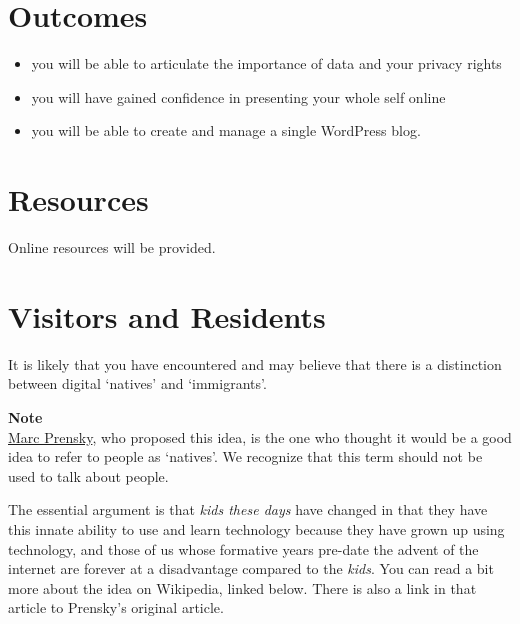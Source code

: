 \documentclass[
]{book}
\providecommand{\tightlist}{%
  \setlength{\itemsep}{0pt}\setlength{\parskip}{0pt}}
\begin{document}
\hypertarget{outcomes}{%
\section*{Outcomes}\label{outcomes}}

\begin{itemize}
\tightlist
\item
  you will be able to articulate the importance of data and your privacy rights\\
\item
  you will have gained confidence in presenting your whole self online\\
\item
  you will be able to create and manage a single WordPress blog.
\end{itemize}

\hypertarget{resources-4}{%
\section*{Resources}\label{resources-4}}

Online resources will be provided.

\hypertarget{visitors-and-residents}{%
\section{Visitors and Residents}\label{visitors-and-residents}}

It is likely that you have encountered and may believe that there is a distinction between digital `natives' and `immigrants'.

\begin{caution}
\textbf{Note}\\
\href{https://marcprensky.com/}{Marc Prensky}, who proposed this idea, is the one who thought it would be a good idea to refer to people as `natives'. We recognize that this term should not be used to talk about people.
\end{caution}

The essential argument is that \emph{kids these days} have changed in that they have this innate ability to use and learn technology because they have grown up using technology, and those of us whose formative years pre-date the advent of the internet are forever at a disadvantage compared to the \emph{kids}. You can read a bit more about the idea on Wikipedia, linked below. There is also a link in that article to Prensky's original article.
\end{document}
